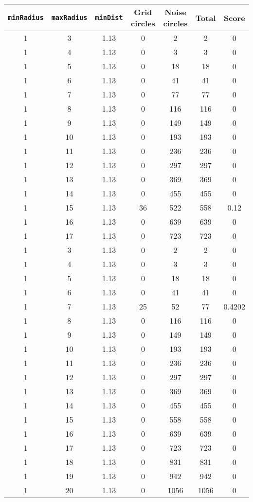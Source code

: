 \documentclass[letterpaper, 12pt]{article}
\begin{document}
\begin{longtable}{|c|c|c|c|c|c|c|}
\hline
\textbf{\texttt{minRadius}} & \textbf{\texttt{maxRadius}} & \textbf{\texttt{minDist}} & \textbf{Grid circles} & \textbf{Noise circles} & \textbf{Total} & \textbf{Score} \\
\hline
1 & 3 & 1.13 & 0 & 2 & 2 & 0 \\
\hline
1 & 4 & 1.13 & 0 & 3 & 3 & 0 \\
\hline
1 & 5 & 1.13 & 0 & 18 & 18 & 0 \\
\hline
1 & 6 & 1.13 & 0 & 41 & 41 & 0 \\
\hline
1 & 7 & 1.13 & 0 & 77 & 77 & 0 \\
\hline
1 & 8 & 1.13 & 0 & 116 & 116 & 0 \\
\hline
1 & 9 & 1.13 & 0 & 149 & 149 & 0 \\
\hline
1 & 10 & 1.13 & 0 & 193 & 193 & 0 \\
\hline
1 & 11 & 1.13 & 0 & 236 & 236 & 0 \\
\hline
1 & 12 & 1.13 & 0 & 297 & 297 & 0 \\
\hline
1 & 13 & 1.13 & 0 & 369 & 369 & 0 \\
\hline
1 & 14 & 1.13 & 0 & 455 & 455 & 0 \\
\hline
1 & 15 & 1.13 & 36 & 522 & 558 & 0.12 \\
\hline
1 & 16 & 1.13 & 0 & 639 & 639 & 0 \\
\hline
1 & 17 & 1.13 & 0 & 723 & 723 & 0 \\
\hline
1 & 3 & 1.13 & 0 & 2 & 2 & 0 \\
\hline
1 & 4 & 1.13 & 0 & 3 & 3 & 0 \\
\hline
1 & 5 & 1.13 & 0 & 18 & 18 & 0 \\
\hline
1 & 6 & 1.13 & 0 & 41 & 41 & 0 \\
\hline
1 & 7 & 1.13 & 25 & 52 & 77 & 0.4202 \\
\hline
1 & 8 & 1.13 & 0 & 116 & 116 & 0 \\
\hline
1 & 9 & 1.13 & 0 & 149 & 149 & 0 \\
\hline
1 & 10 & 1.13 & 0 & 193 & 193 & 0 \\
\hline
1 & 11 & 1.13 & 0 & 236 & 236 & 0 \\
\hline
1 & 12 & 1.13 & 0 & 297 & 297 & 0 \\
\hline
1 & 13 & 1.13 & 0 & 369 & 369 & 0 \\
\hline
1 & 14 & 1.13 & 0 & 455 & 455 & 0 \\
\hline
1 & 15 & 1.13 & 0 & 558 & 558 & 0 \\
\hline
1 & 16 & 1.13 & 0 & 639 & 639 & 0 \\
\hline
1 & 17 & 1.13 & 0 & 723 & 723 & 0 \\
\hline
1 & 18 & 1.13 & 0 & 831 & 831 & 0 \\
\hline
1 & 19 & 1.13 & 0 & 942 & 942 & 0 \\
\hline
1 & 20 & 1.13 & 0 & 1056 & 1056 & 0 \\
\hline
\end{longtable}
\end{document}
